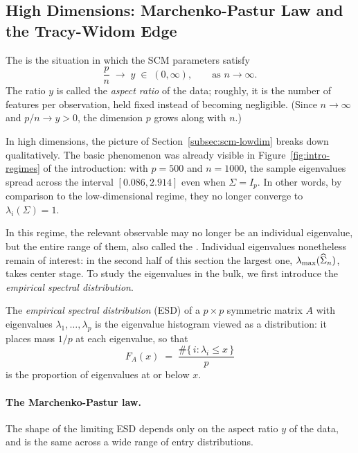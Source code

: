 \subsection{High Dimensions: Marchenko-Pastur Law and the Tracy-Widom Edge}\label{subsec:scm-highdim}

The  is the situation in which the SCM parameters satisfy
\[
  \frac{p}{n} \;\longrightarrow\; y \;\in\; (0, \infty), \qquad \text{as } n \to \infty.
\]
The ratio \(y\) is called the \emph{aspect ratio} of the data; roughly, it is the number of features per observation, held fixed instead of becoming negligible. (Since \(n \to \infty\) and \(p/n \to y > 0\), the dimension \(p\) grows along with \(n\).)

In high dimensions, the picture of Section~\ref{subsec:scm-lowdim} breaks down qualitatively. The basic phenomenon was already visible in Figure~\ref{fig:intro-regimes} of the introduction: with \(p = 500\) and \(n = 1000\), the sample eigenvalues spread across the interval \([0.086, 2.914]\) even when \(\Sigma = I_p\). In other words, by comparison to the low-dimensional regime, they no longer converge to \(\lambda_i(\Sigma) = 1\).

In this regime, the relevant observable may no longer be an individual eigenvalue, but the entire range of them, also called the . Individual eigenvalues nonetheless remain of interest: in the second half of this section the largest one, \(\lambda_{\max}(\widehat{\Sigma}_n)\), takes center stage. To study the eigenvalues in the bulk, we first introduce the \emph{empirical spectral distribution}.


\begin{definition}\label{def:esd}
The \emph{empirical spectral distribution} (ESD) of a \(p \times p\) symmetric matrix \(A\) with eigenvalues \(\lambda_1, \ldots, \lambda_p\) is the eigenvalue histogram viewed as a distribution: it places mass \(1/p\) at each eigenvalue, so that
\[
  F_A(x) \;=\; \frac{\#\{\, i : \lambda_i \le x \,\}}{p}
\]
is the proportion of eigenvalues at or below \(x\).
\end{definition}

\paragraph{The Marchenko-Pastur law.}
The shape of the limiting ESD depends only on the aspect ratio \(y\) of the data, and is the same across a wide range of entry distributions.

